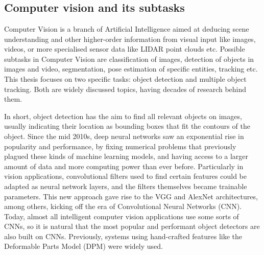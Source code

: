 \chapter*{\bevezetes}



\section*{Computer vision and its subtasks}

Computer Vision is a branch of Artificial Intelligence aimed at deducing scene understanding and other higher-order information from visual input like images, videos, or more specialised sensor data like LIDAR point clouds etc. Possible subtasks in Computer Vision are classification of images, detection of objects in images and video, segmentation, pose estimation of specific entities, tracking etc. This thesis focuses on two specific tasks: object detection and multiple object tracking. Both are widely discussed topics, having decades of research behind them.

In short, object detection has the aim to find all relevant objects on images, usually indicating their location as bounding boxes that fit the contours of the object. Since the mid 2010s, deep neural networks saw an exponential rise in popularity and performance, by fixing numerical problems that previously plagued these kinds of machine learning models, and having access to a larger amount of data and more computing power than ever before. Particularly in vision applications, convolutional filters used to find certain features could be adapted as neural network layers, and the filters themselves became trainable parameters. This new approach gave rise to the VGG and AlexNet architectures, among others, kicking off the era of Convolutional Neural Networks (CNN). Today, almost all intelligent computer vision applications use some sorts of CNNs, so it is natural that the most popular and performant object detectors are also built on CNNs. Previously, systems using hand-crafted features like the Deformable Parts Model (DPM) were widely used.

